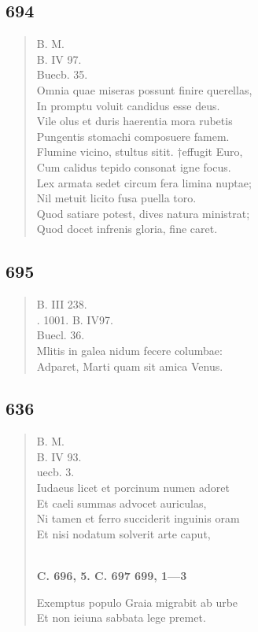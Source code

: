 \documentclass[11pt, a4paper]{report}
\begin{document}
            \subsection*{694}
      \begin{verse}
      B. M. \\ B. IV 97. \\ Buecb. 35. \\ Omnia quae miseras possunt finire querellas, \\ In promptu voluit candidus esse deus. \\ Vile olus et duris haerentia mora rubetis \\ Pungentis stomachi composuere famem. \\ Flumine vicino, stultus sitit. †effugit Euro, \\ Cum calidus tepido consonat igne focus. \\ Lex armata sedet circum fera limina nuptae; \\ Nil metuit licito fusa puella toro. \\ Quod satiare potest, dives natura ministrat; \\ Quod docet infrenis gloria, fine caret. \\ 
      \end{verse}
  
            \subsection*{695}
      \begin{verse}
      B. III 238. \\ . 1001. B. IV97. \\ Buecl. 36. \\ Mlitis in galea nidum fecere columbae: \\ Adparet, Marti quam sit amica Venus. \\ 
      \end{verse}
  
            \subsection*{636}
      \begin{verse}
      B. M. \\ B. IV 93. \\ uecb. 3. \\ Iudaeus licet et porcinum numen adoret \\ Et caeli summas advocet auriculas, \\ Ni tamen et ferro succiderit inguinis oram \\ Et nisi nodatum solverit arte caput, \\ 
        ﻿\pagebreak 
     \marginpar{[170]} \begin{center} \textbf{C. 696, 5. C. 697 699, 1—3} \end{center}Exemptus populo Graia migrabit ab urbe \\ Et non ieiuna sabbata lege premet. \\ 
      \end{verse}
  
\end{document}
